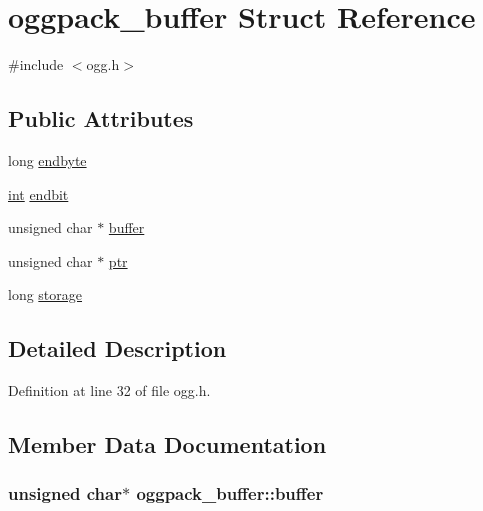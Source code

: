 \hypertarget{structoggpack__buffer}{}\section{oggpack\+\_\+buffer Struct Reference}
\label{structoggpack__buffer}


{\ttfamily \#include $<$ogg.\+h$>$}

\subsection*{Public Attributes}
\begin{DoxyCompactItemize}
\item 
long \hyperlink{structoggpack__buffer_a416200dd77da3603dce3913826d74207}{endbyte}
\item 
\hyperlink{xmltok_8h_a5a0d4a5641ce434f1d23533f2b2e6653}{int} \hyperlink{structoggpack__buffer_a5a2ecb260025f73201e58dbd621c9f8b}{endbit}
\item 
unsigned char $\ast$ \hyperlink{structoggpack__buffer_a2d828a6e3d0a57f44debf56665ad402e}{buffer}
\item 
unsigned char $\ast$ \hyperlink{structoggpack__buffer_a479984d9646e0fba6da8aff21e5c3b64}{ptr}
\item 
long \hyperlink{structoggpack__buffer_a1eea2afb662c8080a902d224773fee4e}{storage}
\end{DoxyCompactItemize}


\subsection{Detailed Description}


Definition at line 32 of file ogg.\+h.



\subsection{Member Data Documentation}
\subsubsection[{\texorpdfstring{buffer}{buffer}}]{\setlength{\rightskip}{0pt plus 5cm}unsigned char$\ast$ oggpack\+\_\+buffer\+::buffer}\hypertarget{structoggpack__buffer_a2d828a6e3d0a57f44debf56665ad402e}{}\label{structoggpack__buffer_a2d828a6e3d0a57f44debf56665ad402e}


